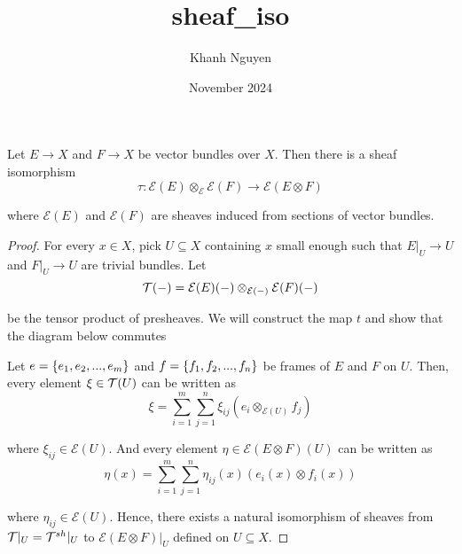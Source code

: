 \documentclass{article}
\title{sheaf\_iso}
\author{Khanh Nguyen}
\date{November 2024}
\begin{document}
\begin{lemma}
    Let $E \to X$ and $F \to X$ be vector bundles over $X$. Then there is a sheaf isomorphism
    $$
        \tau: \mathcal{E}(E) \otimes_\mathcal{E} \mathcal{E}(F) \to \mathcal{E}(E \otimes F)
    $$

    where $\mathcal{E}(E)$ and $\mathcal{E}(F)$ are sheaves induced from sections of vector bundles.
\begin{proof}
    For every $x \in X$, pick $U \subseteq X$ containing $x$ small enough such that $E\vert_U \to U$ and $F\vert_U \to U$ are trivial bundles. Let 
    $$
        \mathcal{T}(-) = \mathcal{E}(E)(-) \otimes_{\mathcal{E}(-)} \mathcal{E}(F)(-)
    $$

    be the tensor product of presheaves. We will construct the map $t$ and show that the diagram below commutes
    \begin{center}
    \end{center}

    Let $e = \{e_1, e_2, ..., e_m\}$ and $f = \{f_1, f_2, ..., f_n\}$ be frames of $E$ and $F$ on $U$. Then, every element $\xi \in \mathcal{T}(U)$ can be written as
    $$
        \xi = \sum_{i=1}^m \sum_{j=1}^n \xi_{ij} (e_i \otimes_{\mathcal{E}(U)} f_j)
    $$

    where $\xi_{ij} \in \mathcal{E}(U)$. And every element $\eta \in \mathcal{E}(E \otimes F)(U)$ can be written as
    $$
        \eta(x) = \sum_{i=1}^m \sum_{j=1}^n \eta_{ij}(x) (e_i(x) \otimes f_i(x))
    $$

    where $\eta_{ij} \in \mathcal{E}(U)$. Hence, there exists a natural isomorphism of sheaves from $\mathcal{T}\vert_U = \mathcal{T}^{sh}\vert_U$ to $\mathcal{E}(E \otimes F)\vert_U$ defined on $U \subseteq X$.


\end{proof}
\end{lemma}
\end{document}
